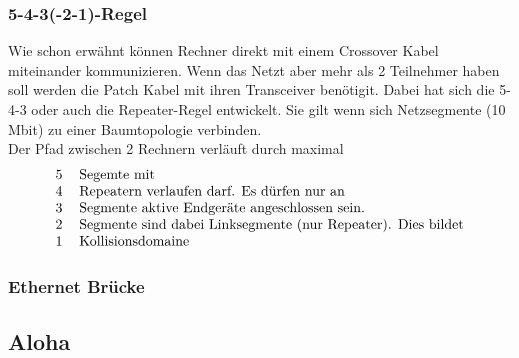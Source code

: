 \documentclass[a4paper,10pt]{scrartcl}
\begin{document}
        \subsubsection{5-4-3(-2-1)-Regel}
            Wie schon erwähnt können Rechner direkt mit einem Crossover Kabel miteinander kommunizieren. Wenn das Netzt aber mehr als 2 Teilnehmer haben soll werden die Patch Kabel mit 
            ihren Transceiver benötigit. Dabei hat sich die 5-4-3 oder auch die Repeater-Regel entwickelt. Sie gilt wenn sich Netzsegmente (10 Mbit) zu einer Baumtopologie verbinden. \\
            Der Pfad zwischen 2 Rechnern verläuft durch maximal
            \[
                \begin{tabular}{ll}
                    5 & Segemte mit \\
                    4 & Repeatern verlaufen darf. Es dürfen nur an \\
                    3 & Segmente aktive Endgeräte angeschlossen sein. \\
                    2 & Segmente sind dabei Linksegmente (nur Repeater). Dies bildet \\
                    1 & Kollisionsdomaine 
                \end{tabular}
            \]   

        \subsubsection{Ethernet Brücke}
        
        \subsection{Aloha}
        
\end{document}
